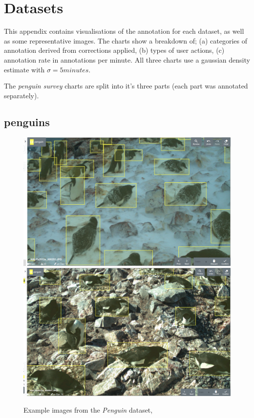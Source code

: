 \chapter{Datasets}
\label{chap:datasets} 

This appendix contains visualisations of the annotation for each dataset, as well as some representative images. The charts show a breakdown of; (a) categories of annotation derived from corrections applied, (b) types of user actions, (c) annotation rate in annotations per minute. All three charts use a gaussian density estimate with $\sigma=5 minutes$. 

The \emph{penguin survey} charts are split into it's three parts (each part was annotated separately).

\newpage
\section{penguins}

\begin{figure}[!h]
\centering
  \includegraphics[width=0.475\linewidth]{figures/annotation/screenshots/penguins.png}
  \hfill
  \includegraphics[width=0.475\linewidth]{figures/annotation/screenshots/penguins2.png}

\caption{Example images from the \emph{Penguin} dataset, \cite{PenguinData}}
\label{fig:penguin_dataset}
\end{figure}

